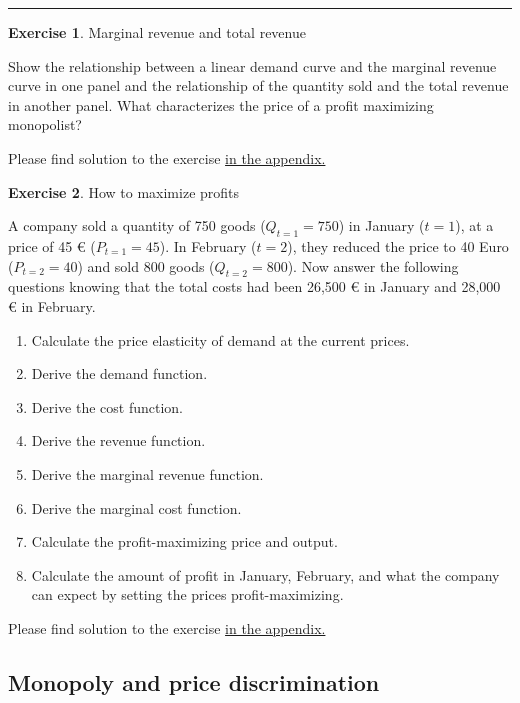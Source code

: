 \documentclass[
  12pt,
  oneside]{book}
\providecommand{\tightlist}{%
  \setlength{\itemsep}{0pt}\setlength{\parskip}{0pt}}
\theoremstyle{definition}
\theoremstyle{definition}
\theoremstyle{definition}
\newtheorem{exercise}{Exercise}[chapter]
\theoremstyle{definition}
\theoremstyle{remark}
\begin{document}
\begin{center}\rule{0.5\linewidth}{0.5pt}\end{center}

\begin{exercise}
\protect\hypertarget{exr:marrevtotrev}{}\label{exr:marrevtotrev}Marginal revenue and total revenue

Show the relationship between a linear demand curve and the marginal revenue curve in one panel and the relationship of the quantity sold and the total revenue in another panel. What characterizes the price of a profit maximizing monopolist?

Please find solution to the exercise \protect\hyperlink{sol:marrevtotrev}{in the appendix.}
\end{exercise}

\begin{exercise}
\protect\hypertarget{exr:howtomaxprofit}{}\label{exr:howtomaxprofit}How to maximize profits

A company sold a quantity of 750 goods (\(Q_{t=1}=750\)) in January (\(t=1\)), at a price of 45 € (\(P_{t=1}=45\)). In February (\(t=2\)), they reduced the price to 40 Euro (\(P_{t=2}=40\)) and sold 800 goods (\(Q_{t=2}=800\)). Now answer the following questions knowing that the total costs had been 26,500 € in January and 28,000 € in February.

\begin{enumerate}
\def\labelenumi{\arabic{enumi}.}
\tightlist
\item
  Calculate the price elasticity of demand at the current prices.
\item
  Derive the demand function.
\item
  Derive the cost function.
\item
  Derive the revenue function.
\item
  Derive the marginal revenue function.
\item
  Derive the marginal cost function.
\item
  Calculate the profit-maximizing price and output.
\item
  Calculate the amount of profit in January, February, and what the company can expect by setting the prices profit-maximizing.
\end{enumerate}

Please find solution to the exercise \protect\hyperlink{sol:howtomaxprofit}{in the appendix.}
\end{exercise}

\hypertarget{monopoly-and-price-discrimination}{%
\subsection{Monopoly and price discrimination}\label{monopoly-and-price-discrimination}}
\end{document}
